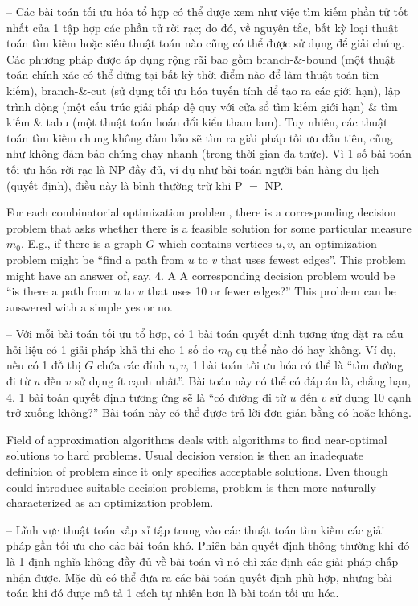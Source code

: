 \documentclass{article}
\begin{document}
-- Các bài toán tối ưu hóa tổ hợp có thể được xem như việc tìm kiếm phần tử tốt nhất của 1 tập hợp các phần tử rời rạc; do đó, về nguyên tắc, bất kỳ loại thuật toán tìm kiếm hoặc siêu thuật toán nào cũng có thể được sử dụng để giải chúng. Các phương pháp được áp dụng rộng rãi bao gồm branch-\&-bound (một thuật toán chính xác có thể dừng tại bất kỳ thời điểm nào để làm thuật toán tìm kiếm), branch-\&-cut (sử dụng tối ưu hóa tuyến tính để tạo ra các giới hạn), lập trình động (một cấu trúc giải pháp đệ quy với cửa sổ tìm kiếm giới hạn) \& tìm kiếm \& tabu (một thuật toán hoán đổi kiểu tham lam). Tuy nhiên, các thuật toán tìm kiếm chung không đảm bảo sẽ tìm ra giải pháp tối ưu đầu tiên, cũng như không đảm bảo chúng chạy nhanh (trong thời gian đa thức). Vì 1 số bài toán tối ưu hóa rời rạc là NP-đầy đủ, ví dụ như bài toán người bán hàng du lịch (quyết định), điều này là bình thường trừ khi P $=$ NP.

For each combinatorial optimization problem, there is a corresponding decision problem that asks whether there is a feasible solution for some particular measure $m_0$. E.g., if there is a graph $G$ which contains vertices $u,v$, an optimization problem might be ``find a path from $u$ to $v$ that uses fewest edges''. This problem might have an answer of, say, 4. A A corresponding decision problem would be ``is there a path from $u$ to $v$ that uses 10 or fewer edges?'' This problem can be answered with a simple yes or no.

-- Với mỗi bài toán tối ưu tổ hợp, có 1 bài toán quyết định tương ứng đặt ra câu hỏi liệu có 1 giải pháp khả thi cho 1 số đo $m_0$ cụ thể nào đó hay không. Ví dụ, nếu có 1 đồ thị $G$ chứa các đỉnh $u,v$, 1 bài toán tối ưu hóa có thể là ``tìm đường đi từ $u$ đến $v$ sử dụng ít cạnh nhất''. Bài toán này có thể có đáp án là, chẳng hạn, 4. 1 bài toán quyết định tương ứng sẽ là ``có đường đi từ $u$ đến $v$ sử dụng 10 cạnh trở xuống không?'' Bài toán này có thể được trả lời đơn giản bằng có hoặc không.

Field of approximation algorithms deals with algorithms to find near-optimal solutions to hard problems. Usual decision version is then an inadequate definition of problem since it only specifies acceptable solutions. Even though could introduce suitable decision problems, problem is then more naturally characterized as an optimization problem.

-- Lĩnh vực thuật toán xấp xỉ tập trung vào các thuật toán tìm kiếm các giải pháp gần tối ưu cho các bài toán khó. Phiên bản quyết định thông thường khi đó là 1 định nghĩa không đầy đủ về bài toán vì nó chỉ xác định các giải pháp chấp nhận được. Mặc dù có thể đưa ra các bài toán quyết định phù hợp, nhưng bài toán khi đó được mô tả 1 cách tự nhiên hơn là bài toán tối ưu hóa.
\end{document}
